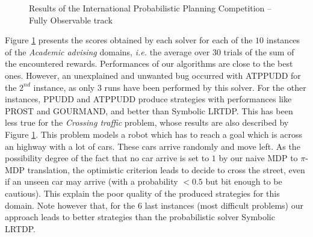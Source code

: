 \begin{figure}
\caption[Results of IPPC 2014: \textit{Academic advising} and \textit{Crossing traffic} problems]{
Results of the International Probabilistic Planning Competition -- Fully Observable track}
\label{figure_IPPC_ACA_CRO}
\end{figure}

Figure \ref{figure_IPPC_ACA_CRO} presents the scores obtained by each solver 
for each of the $10$ instances of the \textit{Academic advising} domains,
\textit{i.e.} the average over $30$ trials of the sum of the encountered rewards.
Performances of our algorithms are close to the best ones.
However, an unexplained and unwanted bug occurred with ATPPUDD for the $2^{nd}$ instance, 
as only $3$ runs have been performed by this solver.
For the other instances, PPUDD and ATPPUDD produce strategies with performances like 
PROST and GOURMAND, and better than Symbolic LRTDP.
This has been less true for the \textit{Crossing traffic} problem, 
whose results are also described by Figure \ref{figure_IPPC_ACA_CRO}.
This problem models a robot which has to reach a goal 
which is across an highway with a lot of cars.
These cars arrive randomly and move left.
As the possibility degree of the fact that no car arrive 
is set to $1$ by our naive MDP to $\pi$-MDP translation,
the optimistic criterion leads to decide to cross the street,
even if an unseen car may arrive (with a probability $<0.5$ but bit enough to be cautious). 
This explain the poor quality of the produced strategies 
for this domain. Note however that, for the $6$ last instances (most difficult problems)
our approach leads to better strategies than the probabilistic solver Symbolic LRTDP.

